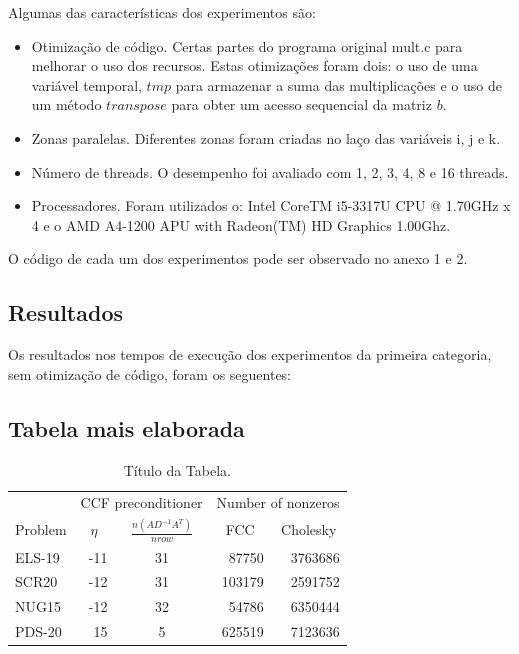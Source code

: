 \documentclass[a4paper,12pt,fleqn]{article}
\begin{document}
Algumas das características dos experimentos são: 
\begin{itemize} 
\item Otimização de código. Certas partes do programa original mult.c para melhorar o uso dos recursos. Estas otimizações foram dois: o uso de uma variável temporal, $tmp$ para armazenar a suma das multiplicações e o uso de um método $transpose$ para obter um acesso sequencial da matriz $b$. 
\item Zonas paralelas. Diferentes zonas foram criadas no laço das variáveis i, j e k.  
\item Número de threads. O desempenho foi avaliado com 1, 2, 3, 4, 8 e 16 threads.   
\item Processadores. Foram utilizados o: Intel CoreTM i5-3317U CPU @ 1.70GHz x 4 e o AMD A4-1200 APU with Radeon(TM) HD Graphics 1.00Ghz.
\end{itemize} 
O código de cada um dos experimentos pode ser observado no anexo 1 e 2.  
\subsection{Resultados} 
Os resultados nos tempos de execução dos experimentos da primeira categoria, sem otimização de código, foram os seguentes: 

\subsection{Tabela mais elaborada}
\begin{table}[htb]
\begin{center}
\begin{tabular}{|l|r|c|r|r|} \hline
            & \multicolumn{2}{|c|}{{CCF preconditioner}} & \multicolumn{2}{|c|}{{Number of nonzeros}} \\ \cline{2-5}
{Problem}   & \multicolumn{1}{|c|}{$\eta$}  & \multicolumn{1}{|c|}{$ \frac{n(AD^{-1}A^T)}{nrow}$} & \multicolumn{1}{|c|}{FCC} & \multicolumn{1}{|c|}{Cholesky}  \\ \hline \hline
ELS-19    &  -11 & 31 &  87750  & 3763686  \\\hline
SCR20     &  -12 & 31 &  103179 & 2591752  \\\hline
NUG15     &  -12 & 32 &  54786  & 6350444 \\\hline
PDS-20    &   15 & 5  &  625519 & 7123636\\\hline
\end{tabular}
\caption{Título da Tabela.}   
\label{tabn}
\end{center}
\end{table}
 
\end{document}

